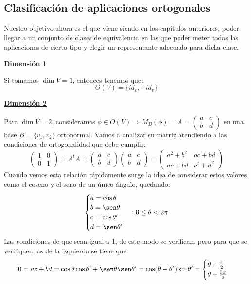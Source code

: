 \documentclass[10pt,a4paper,openright]{book}
\theoremstyle{break}
\begin{document}
\subsection{Clasificación de aplicaciones ortogonales}
Nuestro objetivo ahora es el que viene siendo en los capítulos anteriores, poder llegar a un conjunto de clases de equivalencia en las que poder meter todas las aplicaciones de cierto tipo y elegir un representante adecuado para dicha clase.

\underline{\textbf{Dimensión 1}}

Si tomamos $\dim V = 1$, entonces tenemos que:
$$O(V) = \{id_v, -id_v\}$$

\underline{\textbf{Dimensión 2}}

Para $\dim V = 2$, consideramos $\phi\in O(V)\Rightarrow M_B(\phi) = A = \begin{pmatrix} a & c \\ b & d\end{pmatrix}$ en una base $B = \{v_1, v_2\}$ ortonormal. Vamos a analizar su matriz atendiendo a las condiciones de ortogonalidad que debe cumplir:
$$\begin{pmatrix} 1 & 0 \\ 0 & 1 \end{pmatrix} = A^t A = \begin{pmatrix} a & c  \\ b & d \end{pmatrix} \begin{pmatrix} a & c  \\ b & d  \end{pmatrix} = \begin{pmatrix} a^2+b^2 & ac+bd  \\ ac+bd &c^2 + d^2 \end{pmatrix} $$
Cuando vemos esta relación rápidamente surge la idea de considerar estos valores como el coseno y el seno de un único ángulo, quedando:
$$\begin{cases} a = \cos \theta \\ b = \sen \theta \\ c = \cos \theta' \\ d = \sen \theta'
\end{cases}: 0 \leq \theta < 2\pi$$
Las condiciones de que sean igual a 1, de este modo se verifican, pero para que se verifiquen las de la izquierda se tiene que:
$$0 = ac+bd = \cos \theta \cos \theta ' + \sen \theta \sen \theta' = \cos(\theta - \theta ') \Leftrightarrow \theta ' = \begin{cases} \theta + \frac{\pi}{2}  \\ \theta + \frac{ 3 \pi}{2}\end{cases} $$
\end{document}
